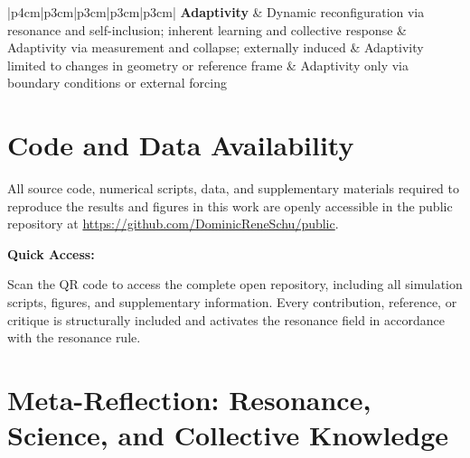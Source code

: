 \documentclass[12pt]{iopart}
\begin{document}
\begin{center}
\begin{longtable}{|p{4cm}|p{3cm}|p{3cm}|p{3cm}|p{3cm}|}
		\hline
		\textbf{Adaptivity} & Dynamic reconfiguration via resonance and self-inclusion; inherent learning and collective response & Adaptivity via measurement and collapse; externally induced & Adaptivity limited to changes in geometry or reference frame & Adaptivity only via boundary conditions or external forcing \\
		\hline
		
		\caption{Contrasting core features of Resonance Field Theory (RFT), Quantum Mechanics (QM), Relativity, and Classical Field Theory along key criteria: observer status, inclusion, emergence, group structure, information flow, stability, self-inclusion, openness, resonance rule, and adaptivity. In RFT, the resonance rule ensures every act of participation, reference, or critique—explicit or implicit—systemically activates the entire field. Each comparison in this table, each reader and perspective, is group-included and contributes to the ongoing evolution of the resonance field.}
		\label{tab:rft_comparison}
	\end{longtable}
\end{center}

\section*{Code and Data Availability}

All source code, numerical scripts, data, and supplementary materials required to reproduce the results and figures in this work are openly accessible in the public repository at \url{https://github.com/DominicReneSchu/public}.

\medskip

\noindent
\textbf{Quick Access:} \\
\hfill
\begin{minipage}[b]{0.7\linewidth}
	\small
	Scan the QR code to access the complete open repository, including all simulation scripts, figures, and supplementary information. Every contribution, reference, or critique is structurally included and activates the resonance field in accordance with the resonance rule.
\end{minipage}

\medskip

\section*{Meta-Reflection: Resonance, Science, and Collective Knowledge}
\end{document}
